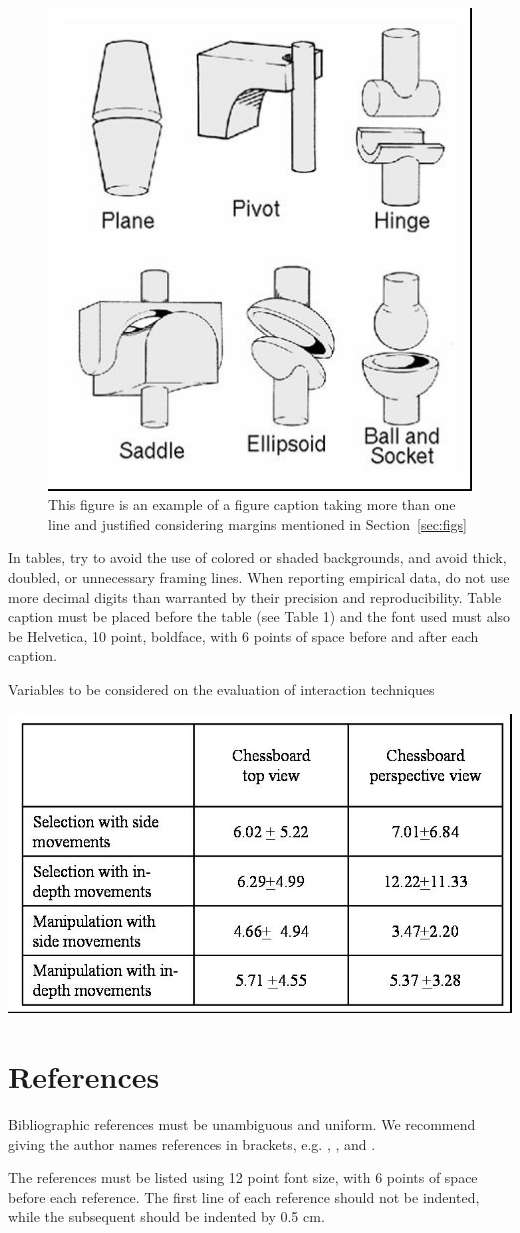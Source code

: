 \documentclass[12pt]{article}
\begin{document}
\begin{figure}[htp]
\centering
\includegraphics[width=.3\textwidth]{fig2.jpg}
\caption{This figure is an example of a figure caption taking more than one
  line and justified considering margins mentioned in Section~\ref{sec:figs}}
\label{fig:exampleFig2}
\end{figure}

In tables, try to avoid the use of colored or shaded backgrounds, and avoid
thick, doubled, or unnecessary framing lines. When reporting empirical data,
do not use more decimal digits than warranted by their precision and
reproducibility. Table caption must be placed before the table (see Table 1)
and the font used must also be Helvetica, 10 point, boldface, with 6 points of
space before and after each caption.

\begin{table}[ht]
\centering
\caption{Variables to be considered on the evaluation of interaction
  techniques}
\label{tab:exTable1}
\includegraphics[width=.7\textwidth]{table.jpg}
\end{table}


\section{References}

Bibliographic references must be unambiguous and uniform.  We recommend giving
the author names references in brackets, e.g. \cite{knuth:84},
\cite{boulic:91}, and \cite{smith:99}.

The references must be listed using 12 point font size, with 6 points of space
before each reference. The first line of each reference should not be
indented, while the subsequent should be indented by 0.5 cm.




\end{document}

